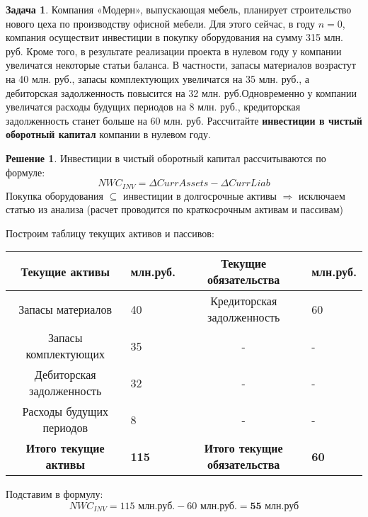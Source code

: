 \documentclass[a4paper, 14pt]{article}
\theoremstyle{plain} %
\theoremstyle{definition} %
\newtheorem*{solution}{Решение}
\newtheorem{problem}{Задача}[subsection]
\theoremstyle{remark} %
\begin{document}
\begin{problem}
    Компания «Модерн», выпускающая мебель, планирует строительство нового цеха по производству офисной мебели. Для этого сейчас, в году $n = 0$, компания осуществит инвестиции в покупку оборудования на сумму 315 млн. руб. Кроме того, в результате реализации проекта в нулевом году у компании увеличатся некоторые статьи баланса. В частности,  запасы  материалов  возрастут  на  40  млн.  руб.,  запасы  комплектующих увеличатся  на  35  млн.  руб.,  а  дебиторская  задолженность  повысится  на 32  млн.  руб.Одновременно  у  компании  увеличатся  расходы  будущих  периодов  на  8  млн.  руб., кредиторская задолженность станет больше на 60 млн. руб. Рассчитайте \textbf{инвестиции в чистый оборотный капитал} компании в нулевом году.
    \begin{solution}
        Инвестиции в чистый оборотный капитал рассчитываются по формуле:
        \[NWC_{INV} = \Delta CurrAssets - \Delta CurrLiab \]
        Покупка оборудования $\subseteq$ инвестиции в долгосрочные активы $\Longrightarrow$ исключаем статью из анализа (расчет проводится по краткосрочным активам и пассивам)

        Построим таблицу текущих активов и пассивов:

        \vspace{0.4em}
        \begin{tabularx}{0.98\textwidth}{|c|X|c|X|}
            \hline
            \textbf{Текущие активы} & \textbf{млн.руб.} & \textbf{Текущие обязательства} & \textbf{млн.руб.} \\
            \hline
            Запасы материалов & 40 & Кредиторская задолженность & 60 \\
            \hline
            Запасы комплектующих & 35 & - & - \\
            \hline
            Дебиторская задолженность & 32 & - & - \\
            \hline
            Расходы будущих периодов & 8 & - & - \\
            \hline
            \textbf{Итого текущие активы} & \textbf{115} & \textbf{Итого текущие обязательства} & \textbf{60} \\
            \hline
        \end{tabularx}

        \vspace{0.4em}
        Подставим в формулу:
        \[NWC_{INV} = \text{115 млн.руб.} - \text{60 млн.руб.} = \textbf{55 млн.руб} \]
    \end{solution}
\end{problem}
\end{document}

